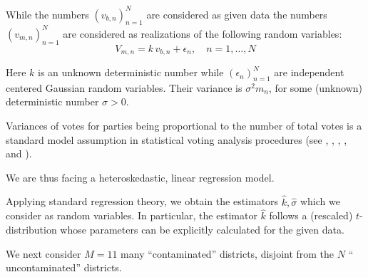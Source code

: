 \documentclass[12pt,a4paper]{article}
\theoremstyle{definition}
\begin{document}

While the numbers $(v_{b,n})^N_{n=1}$ are considered as given data the numbers $(v_{m,n})^N_{n=1}$ are considered as realizations of the following random variables: 
\begin{equation}\label{M1}
V_{m,n}=k \, v_{b,n} + \epsilon_n, \quad n=1, \dots, N
\end{equation}

Here $k$ is an unknown deterministic number while $(\epsilon_n)^N_{n=1}$ are independent centered Gaussian random variables. Their variance is
${\sigma^2}{m_n}$,
for some (unknown) deterministic number $\sigma>0.$ 

Variances of votes for parties being proportional to the number of total votes is a standard model assumption in statistical voting analysis procedures {(see \cite{bruckmann},
\cite{neuw84}, \cite{neuw94}, \cite{neuw2012}, and \cite{ledl}} ).




We are thus facing a heteroskedastic, linear regression model.

Applying standard regression theory, we obtain the estimators $\hat{k}, \hat{\sigma}$ which we consider as random variables. In particular, the estimator $\hat{k}$ follows a (rescaled) $t$-distribution whose parameters can be explicitly calculated for the given data.

We next consider $M=11$ many ``contaminated'' districts, disjoint from the $N$ `` uncontaminated'' districts.
\end{document}
